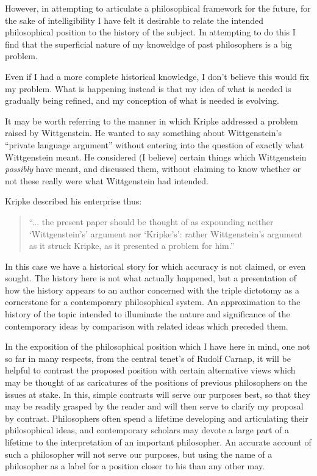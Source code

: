 \documentclass[10pt,titlepage]{article}
\begin{document}
However, in attempting to articulate a philosophical framework for the future, for the sake of intelligibility I have felt it desirable to relate the intended philosophical position to the history of the subject.
In attempting to do this I find that the superficial nature of my knoweldge of past philosophers is a big problem.

Even if I had a more complete historical knowledge, I don't believe this would fix my problem.
What is happening instead is that my idea of what is needed is gradually being refined, and my conception of what is needed is evolving.

It may be worth referring to the manner in which Kripke addressed a problem raised by Wittgenstein.
He wanted to say something about Wittgenstein's ``private language argument'' without entering into the
question of exactly what Wittgenstein meant.
He considered (I believe) certain things which Wittgenstein \emph{possibly} have meant, and discussed them, without claiming to know whether or not these really were what Wittgenstein had intended.

Kripke described his enterprise thus:

\begin{quote}
``... the present paper should be thought of as expounding neither `Wittgenstein's' argument nor `Kripke's': rather Wittgenstein's argument as it struck Kripke, as it presented a problem for him.''
\end{quote}

In this case we have a historical story for which accuracy is not claimed, or even sought.
The history here is not what actually happened, but a presentation of how the history appears to an author concerned with the triple dictotomy as a cornerstone for a contemporary philosophical system.
An approximation to the history of the topic intended to illuminate the nature and significance of the contemporary ideas by comparison with related ideas which preceded them.

In the exposition of the philosophical position which I have here in mind, one not so far in many respects, from the central tenet's of Rudolf Carnap, it will be helpful to contrast the proposed position with certain alternative views which may be thought of as caricatures of the positions of previous philosophers on the issues at stake.
In this, simple contrasts will serve our purposes best, so that they may be readily grasped by the reader and will then serve to clarify my proposal by contrast.
Philosophers often spend a lifetime developing and articulating their philosophical ideas, and contemporary scholars may devote a large part of a lifetime to the interpretation of an important philosopher.
An accurate account of such a philosopher will not serve our purposes, but using the name of a philosopher as a label for a position closer to his than any other may.
\end{document}
